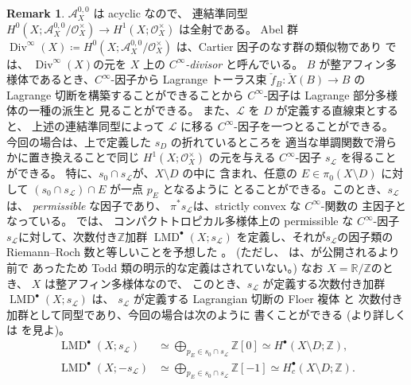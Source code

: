 \documentclass[a4paper,dvipdfmx,reqno,12pt]{amsart}
\theoremstyle{definition}
\newtheorem{remark}[theorem]{Remark}
\newcommand{\deq}{\coloneqq}
\newcommand{\opn}[1]{\operatorname{#1}}
\numberwithin{equation}{section}
\begin{document}
\begin{remark}
$\mathcal{A}^{0,0}_X$ は acyclic なので、
連結準同型
$H^{0}(X;\mathcal{A}^{0,0}_X/\mathcal{O}_X^{\times})
\to H^{1}(X;\mathcal{O}_X^{\times})$ は全射である。
Abel 群 
$\opn{Div}^{\infty}(X)\deq 
H^{0}(X;\mathcal{A}^{0,0}_X/\mathcal{O}_X^{\times})$
は、Cartier 因子のなす群の類似物であり
\cite{tsutsui2023graded} では、
$\opn{Div}^{\infty}(X)$の元を
$X$ 上の \emph{$C^{\infty}$-divisor} と呼んでいる。
$B$ が整アフィン多様体であるとき、$C^{\infty}$-因子から
Lagrange トーラス束 $\check{f}_B\colon \check{X}(B)\to B$
の Lagrange 切断を構築することができることから
$C^{\infty}$-因子は Lagrange 部分多様体の一種の派生と
見ることができる。
また、$\mathcal{L}$ を $D$ が定義する直線束とすると、
上述の連結準同型によって $\mathcal{L}$ に移る
$C^{\infty}$-因子を一つとることができる。
今回の場合は、上で定義した $s_D$ の折れているところを
適当な単調関数で滑らかに置き換えることで同じ
$H^{1}(X;\mathcal{O}_X^{\times})$ の元を与える
$C^{\infty}$-因子 $s_{\mathcal{L}}$ を得ることができる。
特に、$s_0\cap s_{\mathcal{L}}$が、$X\setminus D$ の中に
含まれ、任意の
$E\in\pi_0(X\setminus D)$ に対して
$(s_0\cap s_{\mathcal{L}})\cap E$ が一点 $p_{E}$ となるように
とることができる。このとき、$s_{\mathcal{L}}$ は、
\emph{permissible} な因子であり、
$\pi^{*}s_{\mathcal{L}}$は、strictly convex な
$C^{\infty}$-関数の
主因子となっている。
\cite{tsutsui2023graded}では、
コンパクトトロピカル多様体上の permissible な
$C^{\infty}$-因子 $s_{\mathcal{L}}$に対して、次数付き$\mathbb{Z}$加群
$\opn{LMD}^{\bullet}(X;s_{\mathcal{L}})$
を定義し、それが$s_{\mathcal{L}}$の因子類の
Riemann--Roch 数と等しいことを予想した
\cite[Conjecture 1.2]{tsutsui2023graded}。
(ただし、\cite[Conjecture 1.2]{tsutsui2023graded}
は、\cite{demedrano2023chern}が公開されるより前で
あったため Todd 類の明示的な定義はされていない。)
なお $X=\mathbb{R}/\mathbb{Z}$のとき、
$X$ は整アフィン多様体なので、
このとき、$s_{\mathcal{L}}$ が定義する次数付き加群
$\opn{LMD}^{\bullet}(X;s_{\mathcal{L}})$ は、
$s_{\mathcal{L}}$ が定義する Lagrangian 切断の
Floer 複体 \cite[Remark 13]{MR1882331} と
次数付き加群として同型であり、今回の場合は次のように
書くことができる
(より詳しくは\cite[]{tsutsui2023graded}
を見よ)。
\begin{align}
\opn{LMD}^{\bullet}(X;s_{\mathcal{L}}) &\simeq 
\bigoplus_{p_E\in s_0\cap s_{\mathcal{L}}}\mathbb{Z}[0]
\simeq H^{\bullet}(X\setminus D;\mathbb{Z}), \\
\opn{LMD}^{\bullet}(X;-s_{\mathcal{L}}) &\simeq
\bigoplus_{p_E\in s_0\cap s_{\mathcal{L}}}\mathbb{Z}[-1]
\simeq H^{\bullet}_c(X\setminus D;\mathbb{Z}).
\end{align}

\end{remark}
\end{document}
